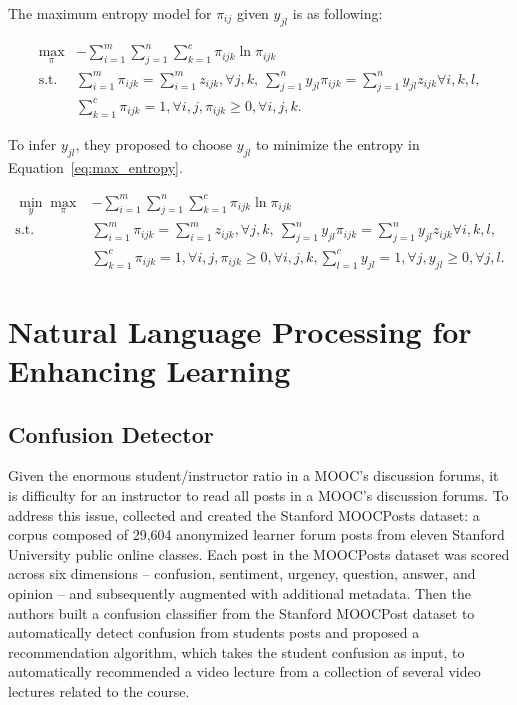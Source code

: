 \documentclass{article}
\begin{document}
The maximum entropy model for $\pi_{ij}$ given $y_{jl}$ is as
following:

\begin{align}
\max_{\pi} & -\sum_{i=1}^{m}\sum_{j=1}^{n}\sum_{k=1}^{c} \pi_{ijk}
\ln \pi_{ijk} \nonumber \\
  \mathrm{s.t.} & \sum_{i=1}^{m}\pi_{ijk} = \sum_{i=1}^{m}z_{ijk},
                  \forall j,k, ~ \sum_{j=1}^{n}y_{jl}\pi_{ijk} =
                  \sum_{j=1}^{n}y_{jl}z_{ijk} \forall i,k,l, \nonumber
  \\
  & \sum_{k=1}^{c}\pi_{ijk}=1, \forall i,j, \pi_{ijk} \geq 0, \forall
    i,j,k. \label{eq:max_entropy}
\end{align}

To infer $y_{jl}$, they proposed to choose $y_{jl}$ to minimize the
entropy in Equation~\ref{eq:max_entropy}.

\begin{align}
\min_{y}\max_{\pi} & -\sum_{i=1}^{m}\sum_{j=1}^{n}\sum_{k=1}^{c} \pi_{ijk}
\ln \pi_{ijk} \nonumber \\
  \mathrm{s.t.} & \sum_{i=1}^{m}\pi_{ijk} = \sum_{i=1}^{m}z_{ijk},
                  \forall j,k, ~ \sum_{j=1}^{n}y_{jl}\pi_{ijk} =
                  \sum_{j=1}^{n}y_{jl}z_{ijk} \forall i,k,l, \nonumber
  \\
  & \sum_{k=1}^{c}\pi_{ijk}=1, \forall i,j, \pi_{ijk} \geq 0, \forall
    i,j,k, \sum_{l=1}^{c}y_{jl}=1, \forall j, y_{jl} \geq 0, \forall
    j, l. \label{eq:minimax_entropy}
\end{align}

\section{Natural Language Processing for Enhancing Learning}
\subsection{Confusion Detector}
Given the enormous student/instructor ratio in a MOOC's discussion
forums, it is difficulty for an instructor to read all posts in a
MOOC's discussion forums. To address this issue, \cite{Agrawal2015-hp}
collected and created the Stanford MOOCPosts dataset: a corpus
composed of 29,604 anonymized learner forum posts from eleven Stanford
University public online classes. Each post in the MOOCPosts dataset
was scored across six dimensions -- confusion, sentiment, urgency,
question, answer, and opinion -- and subsequently augmented with
additional metadata. Then the authors built a confusion classifier from
the Stanford MOOCPost dataset to automatically detect confusion from
students posts and proposed a recommendation algorithm, which takes the
student confusion as input, to automatically recommended a
video lecture from a collection of several video lectures related to
the course.
\end{document}
